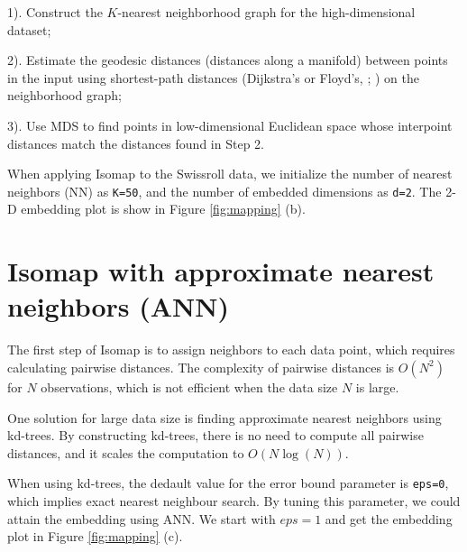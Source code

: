 \documentclass[11pt,a4paper,]{article}
\begin{document}
1). Construct the \(K\)-nearest neighborhood graph for the high-dimensional dataset;

2). Estimate the geodesic distances (distances along a manifold) between points in the input using shortest-path distances (Dijkstra's or Floyd's, \textcite{Dijkstra1959-ml}; \textcite{FloydRobert1962-au}) on the neighborhood graph;

3). Use MDS to find points in low-dimensional Euclidean space whose interpoint distances match the distances found in Step 2.

When applying Isomap to the Swissroll data, we initialize the number of nearest neighbors (NN) as \texttt{K=50}, and the number of embedded dimensions as \texttt{d=2}. The 2-D embedding plot is show in Figure \ref{fig:mapping} (b).

\hypertarget{isomap-with-approximate-nearest-neighbors-ann}{%
\section{Isomap with approximate nearest neighbors (ANN)}\label{isomap-with-approximate-nearest-neighbors-ann}}

The first step of Isomap is to assign neighbors to each data point, which requires calculating pairwise distances. The complexity of pairwise distances is \(O(N^2)\) for \(N\) observations, which is not efficient when the data size \(N\) is large.

One solution for large data size is finding approximate nearest neighbors using kd-trees. By constructing kd-trees, there is no need to compute all pairwise distances, and it scales the computation to \(O(N\log(N))\).

When using kd-trees, the dedault value for the error bound parameter is \texttt{eps=0}, which implies exact nearest neighbour search. By tuning this parameter, we could attain the embedding using ANN. We start with \(eps=1\) and get the embedding plot in Figure \ref{fig:mapping} (c).
\end{document}
